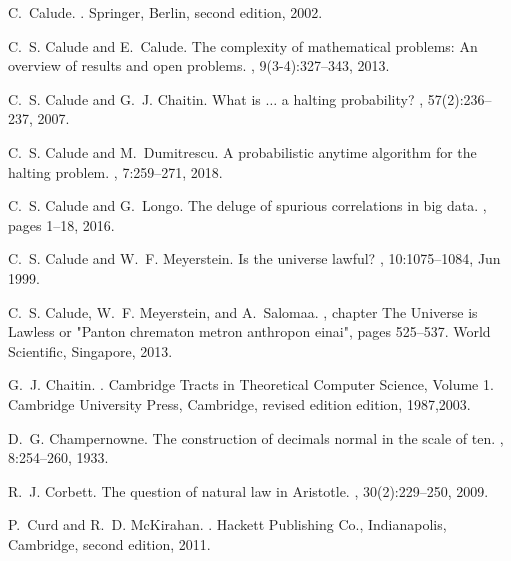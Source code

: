 \documentclass[12pt]{article}
\begin{document}
\begin{thebibliography}{10}
C.~Calude.
.
\newblock Springer, Berlin, second edition, 2002.

C.~S. Calude and E.~Calude.
\newblock The complexity of mathematical problems: An overview of results and
  open problems.
,
  9(3-4):327--343, 2013.

C.~S. Calude and G.~J. Chaitin.
\newblock What is $\ldots$ a halting probability?
, 57(2):236--237, 2007.

C.~S. Calude and M.~Dumitrescu.
\newblock A probabilistic anytime algorithm for the halting problem.
, 7:259--271, 2018.

C.~S. Calude and G.~Longo.
\newblock The deluge of spurious correlations in big data.
, pages 1--18, 2016.

C.~S. Calude and W.~F. Meyerstein.
\newblock Is the universe lawful?
, 10:1075--1084, Jun 1999.

C.~S. Calude, W.~F. Meyerstein, and A.~Salomaa.
, chapter The Universe is Lawless or "Panton chrematon metron
  anthropon einai", pages 525--537.
\newblock World Scientific, Singapore, 2013.

G.~J. Chaitin.
.
\newblock Cambridge Tracts in Theoretical Computer Science, Volume 1. Cambridge
  University Press, Cambridge, revised edition edition, 1987,2003.

D.~G. Champernowne.
\newblock The construction of decimals normal in the scale of ten.
, 8:254--260, 1933.

R.~J. Corbett.
\newblock The question of natural law in {A}ristotle.
, 30(2):229--250, 2009.

P.~Curd and R.~D. McKirahan.
.
\newblock Hackett Publishing Co., Indianapolis, Cambridge, second edition,
  2011.


\end{thebibliography}
\end{document}
